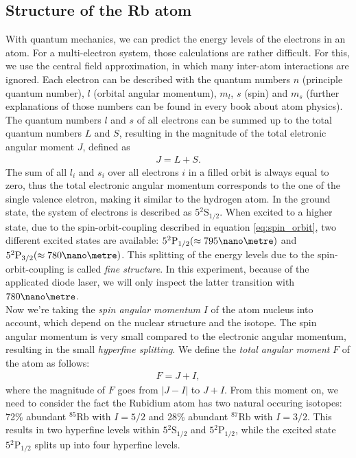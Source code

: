 \subsection{Structure of the Rb atom}
With quantum mechanics, we can predict the energy levels of the electrons in an atom. For a multi-electron system, those calculations are rather difficult. For this, we use the central field approximation, in which many inter-atom interactions are ignored. Each electron can be described with the quantum numbers $n$ (principle quantum number), $l$ (orbital angular momentum), $m_l$, $s$ (spin) and $m_s$ (further explanations of those numbers can be found in every book about atom physics). The quantum numbers $l$ and $s$ of all electrons can be summed up to the total quantum numbers $L$ and $S$, resulting in the magnitude of the total eletronic angular moment $J$, defined as
\begin{align}
J=L+S.
\label{eq:spin_orbit}
\end{align}
The sum of all $l_i$ and $s_i$ over all electrons $i$ in a filled orbit is always equal to zero, thus the total electronic angular momentum corresponds to the one of the single valence eletron, making it similar to the hydrogen atom. In the ground state, the system of electrons is described as $5{}^2\mathrm{S}_{1/2}$. When excited to a higher state, due to the spin-orbit-coupling described in equation \eqref{eq:spin_orbit}, two different excited states are available: $5{}^2\mathrm{P}_{1/2} (\approx 795 \nano\metre)$ and $5{}^2\mathrm{P}_{3/2} (\approx 780\nano\metre)$. This splitting of the energy levels due to the spin-orbit-coupling is called \emph{
fine structure}. In this experiment, because of the applicated diode laser, we will only inspect the latter transition with $780\nano\metre$.\\
Now we're taking the \emph{spin angular momentum} $I$ of the atom nucleus into account, which depend on the nuclear structure and the isotope. The spin angular momentum is very small compared to the electronic angular momentum, resulting in the small \emph{hyperfine splitting}. We define the \emph{total angular moment} $F$ of the atom as follows:
\begin{align}
F=J+I,
\end{align}
where the magnitude of $F$ goes from $|J-I|$ to $J+I$.
From this moment on, we need to consider the fact the Rubidium atom has two natural occuring  isotopes: 72\% abundant $^{85}\text{Rb}$ with $I=5/2$ and 28\% abundant $^{87}\text{Rb}$ with $I=3/2$. This results in two hyperfine levels within $5{}^2\mathrm{S}_{1/2}$ and $5{}^2\mathrm{P}_{1/2}$, while the excited state $5{}^2\mathrm{P}_{1/2}$ splits up into four hyperfine levels.
